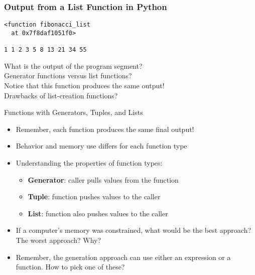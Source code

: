 \documentclass[14pt,aspectratio=169]{beamer}
\begin{document}
%
\begin{frame}[fragile]
  \frametitle{Output from a List Function in Python}
  \normalsize
  \begin{minipage}{6in}
    \vspace*{.1in}
    \begin{verbatim}
<function fibonacci_list
  at 0x7f8daf1051f0>

1 1 2 3 5 8 13 21 34 55
    \end{verbatim}
  \vspace*{.35in}
  \begin{minipage}{5.2in}
  \begin{center}
    \normalsize \noindent What is the output of the program segment? \\
    \normalsize \noindent Generator functions versus list functions? \\
    \normalsize \noindent Notice that this function produces the same output! \\
    \normalsize \noindent Drawbacks of list-creation functions? \\
  \end{center}
  \end{minipage}
  \end{minipage}
\end{frame}

%
\begin{frame}{Functions with Generators, Tuples, and Lists}
  \begin{itemize}
    \item Remember, each function produces the same final output!
      \vspace*{-.15in}
    \item Behavior and memory use differs for each function type
      \vspace*{-.15in}
    \item Understanding the properties of function types:
      \begin{itemize}
        \item {\bf Generator}: caller pulls values from the function
        \item {\bf Tuple}: function pushes values to the caller
        \item {\bf List}: function also pushes values to the caller
      \end{itemize}
      \vspace*{-.2in}
    \item If a computer's memory was constrained, what would be the best
      approach? The worst approach? Why?
      \vspace*{-.2in}
    \item Remember, the generation approach can use either an expression or a
      function. How to pick one of these?
  \end{itemize}
\end{frame}
\end{document}
